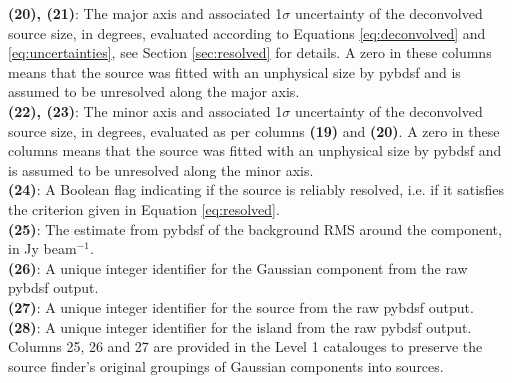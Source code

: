 \documentclass[usenatbib,usedcolumn]{mnras}
\begin{document}
\noindent
{\bf (20), (21)}: The major axis and associated 1$\sigma$ uncertainty of the deconvolved source size, in degrees, evaluated according to Equations \ref{eq:deconvolved} and \ref{eq:uncertainties}, see Section \ref{sec:resolved} for details. A zero in these columns means that the source was fitted with an unphysical size by {\sc pybdsf} and is assumed to be unresolved along the major axis.
\\

\noindent
{\bf (22), (23)}: The minor axis and associated 1$\sigma$ uncertainty of the deconvolved source size, in degrees, evaluated as per columns {\bf (19)} and {\bf (20)}. A zero in these columns means that the source was fitted with an unphysical size by {\sc pybdsf} and is assumed to be unresolved along the minor axis.
\\

\noindent
{\bf (24)}: A Boolean flag indicating if the source is reliably resolved, i.e. if it satisfies the criterion given in Equation \ref{eq:resolved}.
\\

\noindent
{\bf (25)}: The estimate from {\sc pybdsf} of the background RMS around the component, in Jy beam$^{-1}$.
\\

\noindent
{\bf (26)}: A unique integer identifier for the Gaussian component from the raw {\sc pybdsf} output.
\\

\noindent
{\bf (27)}: A unique integer identifier for the source from the raw {\sc pybdsf} output.
\\

\noindent
{\bf (28)}: A unique integer identifier for the island from the raw {\sc pybdsf} output. Columns 25, 26 and 27 are provided in the Level 1 catalouges to preserve the source finder's original groupings of Gaussian components into sources.
\\
\end{document}
